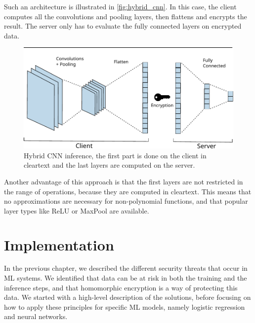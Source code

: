 \documentclass[a4paper,11pt,oneside]{report}
\begin{document}
Such an architecture is illustrated in \autoref{fig:hybrid_cnn}.
In this case, the client computes all the convolutions and pooling layers, then flattens and encrypts the result. 
The server only has to evaluate the fully connected layers on encrypted data.

\begin{figure}[h]
  \centering
  \includegraphics[width=\textwidth]{figures/layers.pdf}
  \caption{Hybrid CNN inference, the first part is done on the client in cleartext and the last layers are computed on the server.}
  \label{fig:hybrid_cnn}
\end{figure}

Another advantage of this approach is that the first layers are not restricted in the range of operations, because they are computed in cleartext. 
This means that no approximations are necessary for non-polynomial functions, and that popular layer types like ReLU or MaxPool are available.


\chapter{Implementation}\label{chap:implementation}



In the previous chapter, we described the different security threats that occur in ML systems. 
We identified that data can be at risk in both the training and the inference steps, and that homomorphic encryption is a way of protecting this data.
We started with a high-level description of the solutions, before focusing on how to apply these principles for specific ML models, namely logistic regression and neural networks.
\end{document}
